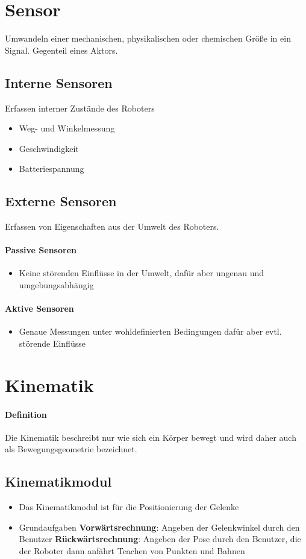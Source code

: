 \section{Sensor}
Umwandeln einer mechanischen, physikalischen oder chemischen Größe in ein Signal.
Gegenteil eines Aktors.
\subsection{Interne Sensoren} Erfassen interner Zustände des Roboters
\begin{itemize}
	\item Weg- und Winkelmessung
	\item Geschwindigkeit
	\item Batteriespannung
\end{itemize}
\subsection{Externe Sensoren}
Erfassen von Eigenschaften aus der Umwelt des Roboters.
\paragraph{Passive Sensoren}
\begin{itemize}
	\item Keine störenden Einflüsse in der Umwelt, dafür aber ungenau und umgebungsabhängig
\end{itemize}
\paragraph{Aktive Sensoren}
\begin{itemize}
	\item Genaue Messungen unter wohldefinierten Bedingungen dafür aber evtl. störende Einflüsse
\end{itemize}
\section{Kinematik}
\paragraph{Definition}
Die Kinematik beschreibt nur wie sich ein Körper bewegt und wird daher auch als Bewegungsgeometrie bezeichnet.
\subsection{Kinematikmodul}
\begin{itemize}
	\item Das Kinematikmodul ist für die Positionierung der Gelenke
	\item Grundaufgaben
	\subitem \textbf{Vorwärtsrechnung}: Angeben der Gelenkwinkel durch den Benutzer
	\subitem \textbf{Rückwärtsrechnung}: Angeben der Pose durch den Benutzer, die der Roboter dann anfährt
	\subitem Teachen von Punkten und Bahnen
\end{itemize}
